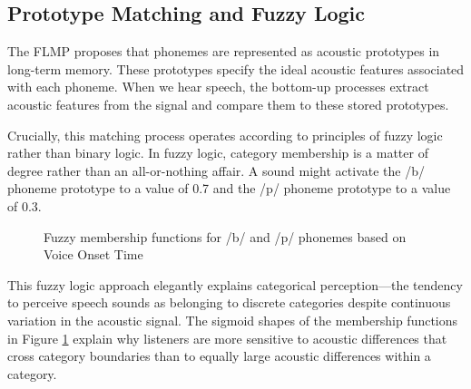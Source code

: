 \documentclass[12pt,a4paper]{article}
\begin{document}
\subsection{Prototype Matching and Fuzzy Logic}

The FLMP proposes that phonemes are represented as acoustic prototypes in long-term memory. These prototypes specify the ideal acoustic features associated with each phoneme. When we hear speech, the bottom-up processes extract acoustic features from the signal and compare them to these stored prototypes.

Crucially, this matching process operates according to principles of fuzzy logic rather than binary logic. In fuzzy logic, category membership is a matter of degree rather than an all-or-nothing affair. A sound might activate the /b/ phoneme prototype to a value of 0.7 and the /p/ phoneme prototype to a value of 0.3.

\begin{figure}[h]
\centering
{}
\caption{Fuzzy membership functions for /b/ and /p/ phonemes based on Voice Onset Time}
\label{fig:fuzzy_membership}
\end{figure}

This fuzzy logic approach elegantly explains categorical perception—the tendency to perceive speech sounds as belonging to discrete categories despite continuous variation in the acoustic signal. The sigmoid shapes of the membership functions in Figure \ref{fig:fuzzy_membership} explain why listeners are more sensitive to acoustic differences that cross category boundaries than to equally large acoustic differences within a category.
\end{document}

